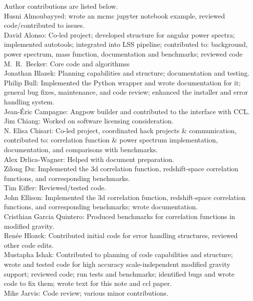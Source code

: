 Author contributions are listed below. \\
Husni Almoubayyed: wrote an mcmc jupyter notebook example, reviewed code/contributed to issues. \\
David Alonso: Co-led project; developed structure for angular power spectra; implemented autotools; integrated into LSS pipeline; contributed to: background, power spectrum, mass function, documentation and benchmarks; reviewed code \\
M.~R.~Becker: Core code and algorithmss \\
Jonathan Blazek: Planning capabilities and structure; documentation and testing. \\
Philip Bull: Implemented the Python wrapper and wrote documentation for it; general bug fixes, maintenance, and code review; enhanced the installer and error handling system. \\
Jean-\'Eric Campagne: Angpow builder and contributed to the interface with CCL. \\
Jim Chiang: Worked on software licensing consideration. \\
N. Elisa Chisari: Co-led project, coordinated hack projects \& communication, contributed to: correlation function \& power spectrum implementation, documentation, and comparisons with benchmarks. \\
Alex Drlica-Wagner: Helped with document preparation. \\
Zilong Du: Implemented the 3d correlation function, redshift-space correlation functions, and corresponding benchmarks. \\
Tim Eifler: Reviewed/tested code. \\
John Ellison: Implemented the 3d correlation function, redshift-space correlation functions, and corresponding benchmarks; wrote documentation. \\
Cristhian Garcia Quintero: Produced benchmarks for correlation functions in modified gravity. \\
Ren\'ee Hlozek: Contributed initial code for error handling structures, reviewed other code edits. \\
Mustapha Ishak: Contributed to planning of code capabilities and structure; wrote and tested code for high accuracy scale-independent modified gravity support; reviewed code; run tests and benchmarks; identified bugs and wrote code to fix them; wrote text for this note and ccl paper. \\
Mike Jarvis: Code review; various minor contributions. \\
